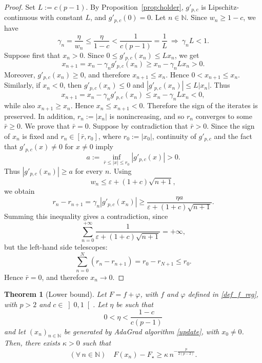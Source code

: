 \documentclass[11pt]{article}
\newtheorem{theorem}{Theorem}
\newcommand{\N}{\mathbb{N}}
\begin{document}
\begin{proof}
Set \(L:=c(p-1)\). By Proposition~\ref{prop:holder}, \(g'_{p,c}\) is Lipschitz-continuous with constant \(L\), and \(g'_{p,c}(0)=0\). 
Let $n\in \N$. Since \(w_n\ge1-c\), we have
\begin{equation*}
    \gamma_n
    =
    \frac{\eta}{w_n}
    \le
    \frac{\eta}{1-c}
    <
    \frac1{c(p-1)}
    =
    \frac1L\ \Rightarrow\ \gamma_n L<1.
\end{equation*}
Suppose first that \(x_n>0\). Since \(0\le g'_{p,c}(x_n)\le Lx_n\), we get
\begin{equation*}
    x_{n+1}
    =
    x_n-\gamma_ng'_{p,c}(x_n)
    \ge
    x_n-\gamma_nLx_n
    >0.
\end{equation*}
Moreover, \(g'_{p,c}(x_n)\ge0\), and therefore \(x_{n+1}\le x_n\). Hence \(0< x_{n+1}\le x_n\).
Similarly, if \(x_n<0\), then \(g'_{p,c}(x_n)\le0\) and \(|g'_{p,c}(x_n)|\le L|x_n|\). Thus
\begin{equation*}
    x_{n+1}
    =
    x_n-\gamma_ng'_{p,c}(x_n) \leq     x_n-\gamma_nLx_n
    < 0,
\end{equation*}
while also \(x_{n+1}\ge x_n\). Hence \(x_n\le x_{n+1}<0\).
Therefore the sign of the iterates is preserved. In addition, \(r_n:=|x_n|\) is nonincreasing, and so \(r_n\) converges to some \(\bar r\ge0\). We prove that \(\bar r=0\). Suppose by contradiction that \(\bar r>0\). Since the sign of \(x_n\) is fixed and \(r_n\in[\bar r,r_0]\), where \(r_0:=|x_0|\), continuity of \(g'_{p,c}\) and the fact that \(g'_{p,c}(x)\neq0\) for \(x\neq0\) imply
\[
    a
    :=
    \inf_{\bar r\le |x|\le r_0}
    |g'_{p,c}(x)|
    >
    0.
\]
Thus \(|g'_{p,c}(x_n)|\ge a\) for every \(n\). Using
\[
    w_n\le \varepsilon+(1+c)\sqrt{n+1},
\]
we obtain
\[
    r_n-r_{n+1}
    =
    \gamma_n|g'_{p,c}(x_n)|
    \ge
    \frac{\eta a}{\varepsilon+(1+c)\sqrt{n+1}}.
\]
Summing this inequality gives a contradiction, since
\[
    \sum_{n=0}^{+\infty}
    \frac{1}{\varepsilon+(1+c)\sqrt{n+1}}
    =
    +\infty,
\]
but the left-hand side telescopes:
\[
    \sum_{n=0}^N(r_n-r_{n+1})
    =
    r_0-r_{N+1}
    \le r_0.
\]
Hence \(\bar r=0\), and therefore \(x_n\to0\).
\end{proof}

\begin{theorem}[Lower bound]
\label{lem:nonasymptotic-lower-bound}
Let $F=f+\varphi$, with $f$ and $\varphi$ defined in \eqref{def_f_reg}, with $p>2$ and $c\in \left]0,1\right[$.
Let $\eta$ be such that
\begin{equation*}
    0<\eta< \frac{1-c}{c(p-1)}
\end{equation*}
and let $(x_n)_{n\in \N}$ be generated by AdaGrad algorithm \eqref{update}, with $x_0\neq 0$. Then, there exists $\kappa>0$
such that
\begin{equation*}
(\forall\,n\in \N)\quad
    F(x_n)-F_\star
    \ge
    \kappa\,
    n^{-\frac{p}{2(p-2)}}.
\end{equation*}
\end{theorem}
\end{document}
